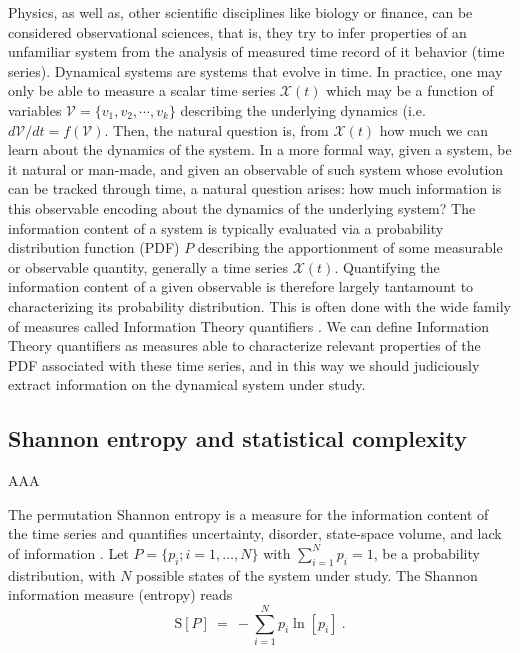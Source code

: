 Physics, as well as, other scientific disciplines like biology or finance, can be considered observational sciences, that is, they try to infer  properties of an unfamiliar system from  the analysis of measured time record of it behavior (time series).  
Dynamical systems are systems that evolve in time.
In practice, one may only be able to measure a scalar time series ${\mathcal X}(t)$ which may be a function of variables ${\mathcal V}=\{ v_1,  v_2,\cdots, v_k\}$ describing the underlying dynamics (i.e. $d{\mathcal V}/dt=f({\mathcal V})$.
Then, the natural question is, from ${\mathcal X}(t)$ how much  we can learn about the dynamics of the system.
In a  more formal way, given a system, be it natural or man-made, and given an observable of such system whose evolution can be tracked through time, a natural question arises: how much information is this observable encoding about the dynamics of the underlying system? 
The information content of a system is typically evaluated via a probability distribution function (PDF) $P$ describing the apportionment of some measurable or observable quantity, generally a time series ${\mathcal X}(t)$. 
Quantifying the information content of a given observable is therefore largely tantamount to characterizing its probability distribution. 
This is often done with the wide family of measures called Information Theory quantifiers \cite{Gray1990}.
We can define Information Theory quantifiers as measures able to characterize relevant properties of the PDF associated with these time series, and in this way we should judiciously extract information on the dynamical system under study.

\subsection{Shannon entropy and statistical complexity}

AAA

The permutation Shannon entropy is a measure for the information content of the time series \cite{Shannon1948} and quantifies uncertainty,  disorder, state-space volume, and lack of information \cite{Brissaud2005}. 
Let $P=\{p_i; i=1,\ldots, N\}$ with $\sum_{i=1}^N p_i = 1$, be a  probability distribution, with $N$ 
possible states of the system under study.
The Shannon information measure (entropy) reads
\begin{equation}
\label{Shannon-disc}
{\mathrm S}[P] ~=~ -\sum_{i=1}^{N} p_i \ln \left[ p_i \right] \ .
\end{equation}

